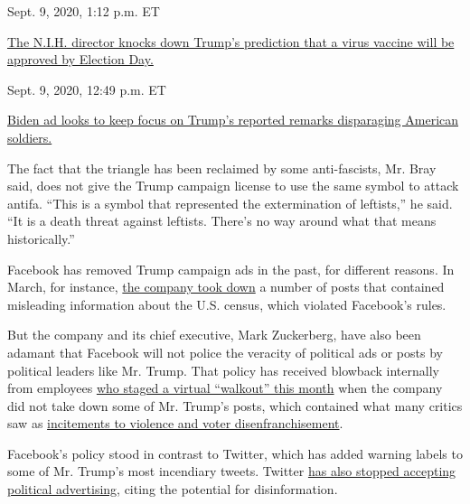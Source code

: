 Sept. 9, 2020, 1:12 p.m. ET

\href{https://www.nytimes3xbfgragh.onion/live/2020/09/09/us/trump-vs-biden\#the-nih-director-knocks-down-trumps-prediction-that-a-virus-vaccine-will-be-approved-by-election-day}{The
N.I.H. director knocks down Trump's prediction that a virus vaccine will
be approved by Election
Day.}\href{https://www.nytimes3xbfgragh.onion/live/2020/09/09/us/trump-vs-biden\#biden-ad-looks-to-keep-focus-on-trumps-reported-remarks-disparaging-american-soldiers}{}

Sept. 9, 2020, 12:49 p.m. ET

\href{https://www.nytimes3xbfgragh.onion/live/2020/09/09/us/trump-vs-biden\#biden-ad-looks-to-keep-focus-on-trumps-reported-remarks-disparaging-american-soldiers}{Biden
ad looks to keep focus on Trump's reported remarks disparaging American
soldiers.}

The fact that the triangle has been reclaimed by some anti-fascists, Mr.
Bray said, does not give the Trump campaign license to use the same
symbol to attack antifa. ``This is a symbol that represented the
extermination of leftists,'' he said. ``It is a death threat against
leftists. There's no way around what that means historically.''

Facebook has removed Trump campaign ads in the past, for different
reasons. In March, for instance,
\href{https://www.bbc.com/news/world-us-canada-51730185}{the company
took down} a number of posts that contained misleading information about
the U.S. census, which violated Facebook's rules.

But the company and its chief executive, Mark Zuckerberg, have also been
adamant that Facebook will not police the veracity of political ads or
posts by political leaders like Mr. Trump. That policy has received
blowback internally from employees
\href{https://www.nytimes3xbfgragh.onion/2020/06/01/technology/facebook-employee-protest-trump.html}{who
staged a virtual ``walkout'' this month} when the company did not take
down some of Mr. Trump's posts, which contained what many critics saw as
\href{https://www.nytimes3xbfgragh.onion/2020/05/29/technology/twitter-facebook-zuckerberg-trump.html}{incitements
to violence and voter disenfranchisement}.

Facebook's policy stood in contrast to Twitter, which has added warning
labels to some of Mr. Trump's most incendiary tweets. Twitter
\href{https://www.nytimes3xbfgragh.onion/2019/10/30/technology/twitter-political-ads-ban.html}{has
also stopped accepting political advertising}, citing the potential for
disinformation.

